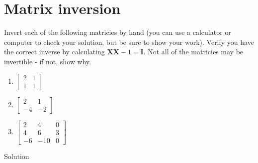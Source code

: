 \documentclass[12pt]{article}
\begin{document}
\section{Matrix inversion}
Invert each of the following matricies by hand (you can use a calculator or computer to check your solution, but be sure to show your work). Verify you have the correct inverse by calculating $\mathbf{X}\mathbf{X}-1 = \mathbf{I
}$. Not all of the matricies may be invertible - if not, show why.
\begin{enumerate}
    \item $\begin{bmatrix}
    2&1 \\ 1&1\end{bmatrix} $
    \item $\begin{bmatrix}
    2&1 \\ -4&-2\end{bmatrix} $
    \item $\begin{bmatrix}
    2&4&0 \\ 4&6&3\\ -6&-10&0\end{bmatrix} $
\end{enumerate}
Solution
\end{document}
